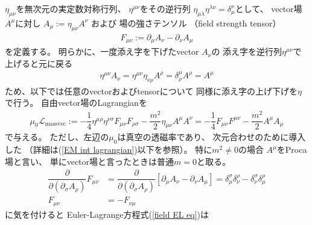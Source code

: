 $\eta_{\mu\nu}$を無次元の実定数対称行列、
$\eta^{\mu\nu}$をその逆行列
$\eta_{\mu\lambda} \eta^{\lambda \nu} = \delta_\mu^\nu$として、
vector場$A^\mu$に対し
$A_\mu := \eta_{\mu\nu} A^\nu$
および
場の強さテンソル
（field strength tensor）
\begin{align}
    F_{\mu\nu}
:=
    \partial_\mu A_\nu
    - \partial_\nu A_\mu
\label{field strength definition}
\end{align}
を定義する。
明らかに、一度添え字を下げたvector $A_\nu$の
添え字を逆行列$\eta^{\mu\nu}$で上げると元に戻る
\begin{align}
    \eta^{\mu\nu} A_\nu
    =
    \eta^{\mu\nu} \eta_{\nu \rho} A^\rho
    =
    \delta^\mu_\rho A^\rho
    =
    A^\mu
\end{align}
ため、以下では任意のvectorおよびtensorについて
同様に添え字の上げ下げを$\eta$で行う。
自由vector場のLagrangianを
\begin{align}
    \mu_0 \mathcal{L}_{\text{massvec}}
:=
    -
    \dfrac{1}{4}
        \eta^{\mu\rho}
        \eta^{\nu\sigma}
    F_{\mu\nu} F_{\rho\sigma}
    -
    \dfrac{m^2}{2}
        \eta_{\mu \nu}
        A^\mu A^\nu
=
    - \dfrac{1}{4}
    F_{\mu\nu} F^{\mu\nu}
    -
    \dfrac{m^2}{2}
		A^\mu A_\mu
\label{massive free vector lagrangian}
\end{align}
で与える。
ただし、左辺の$\mu_0$は真空の透磁率であり、
次元合わせのために導入した
（詳細は(\ref{EM int lagrangian})以下を参照）。
特に$m^2 \neq 0$の場合
$A^\mu$をProca場と言い、
単にvector場と言ったときは普通$m = 0$と取る。
\begin{align}
    \dfrac{\partial}
        {\partial (\partial_\sigma A_\rho)}
    F_{\mu\nu}
    &=
    \dfrac{\partial}
        {\partial (\partial_\sigma A_\rho)}
    \left[
        \partial_\mu A_\nu
        - \partial_\nu A_\mu
    \right]
    =
    \delta_\mu^\sigma
    \delta_\nu^\rho
    -
    \delta_\nu^\sigma
    \delta_\mu^\rho
\\
    F_{\mu\nu} &= - F_{\nu\mu}
\end{align}
に気を付けると
Euler-Lagrange方程式(\ref{field EL eq})は
